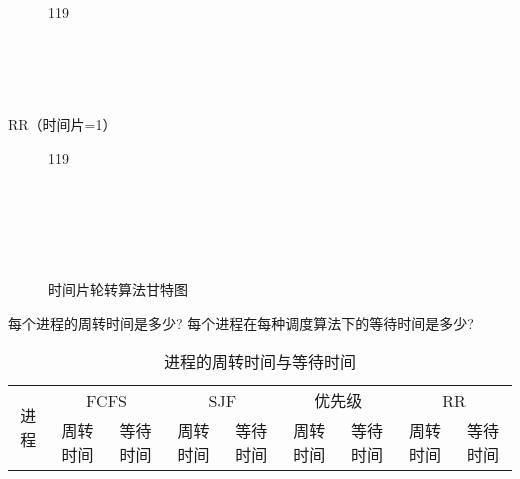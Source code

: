 \documentclass{ctexart}
\begin{document}
\begin{outline}[enumerate]
\begin{figure}[H]
\begin{os-gantt}[
                y unit = .5cm,
                bar height = 1
            ]{1}{19}
                 \\
                 \\
                 \\
                 \\
                 \\
            \end{os-gantt}
        \end{figure}
        \3 RR（时间片=1）
        \begin{figure}[H]
            \caption{时间片轮转算法甘特图}
            \centering
            \begin{os-gantt}[
                y unit = .5cm,
                bar height = 1
            ]{1}{19}
                 \\
                  
                  
                  \\
                 \\
                  
                  
                 \\
                 \\
                 \\
            \end{os-gantt}
        \end{figure}
    \2 每个进程的周转时间是多少?
    \2 每个进程在每种调度算法下的等待时间是多少?
        \begin{table}[H]
            \centering
            \caption{进程的周转时间与等待时间}
            \begin{tabular}{*{9}{c}}
            \toprule
            \multirow{2}{*}[-2pt]{进程} & \multicolumn{2}{c}{FCFS} & \multicolumn{2}{c}{SJF} 
                & \multicolumn{2}{c}{优先级} & \multicolumn{2}{c}{RR} \\
            \cmidrule(lr){2-3}
            \cmidrule(lr){4-5}
            \cmidrule(lr){6-7}
            \cmidrule(lr){8-9}
                & 周转时间 & 等待时间 & 周转时间 & 等待时间 & 周转时间 & 等待时间 & 周转时间 & 等待时间 \\

\end{tabular}
\end{table}
\end{outline}
\end{document}

